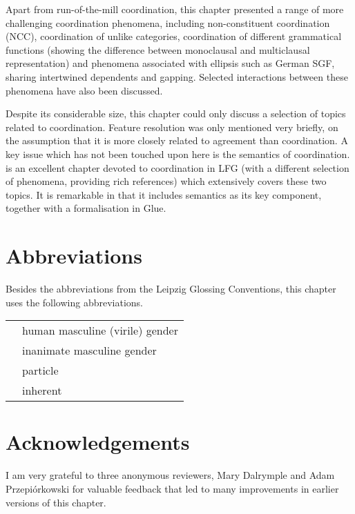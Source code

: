 \documentclass[output=paper]{../langscibook}
\begin{document}
Apart from run-of-the-mill coordination, this chapter
presented a range of more challenging coordination phenomena,
including non-constituent coordination (NCC), coordination of unlike
categories, coordination of different grammatical functions (showing
the difference between monoclausal and multiclausal representation)
and phenomena associated with ellipsis such as German SGF, sharing
intertwined dependents and gapping. Selected interactions between
these phenomena have also been discussed.

Despite its considerable size, this chapter could only discuss a
selection of topics related to coordination. Feature resolution was
only mentioned very briefly, on the assumption that it is more closely
related to agreement than coordination. A key issue which has not been
touched upon here is the semantics of
coordination. \citet[Chapter~16]{DLM:LFG} is an excellent chapter
devoted to coordination in LFG (with a different selection of
phenomena, providing rich references) which extensively covers these
two topics. It is remarkable in that it includes semantics as its key component,
together with a formalisation in Glue.

\section*{Abbreviations}

Besides the abbreviations from the Leipzig Glossing Conventions, this
chapter uses the following abbreviations.\medskip

\noindent\begin{tabularx}{\textwidth}{lQ}
 & human masculine (virile) gender\\
 & inanimate masculine gender\\
 & particle\\
 & inherent 
\end{tabularx}

\section*{Acknowledgements}

I am very grateful to three anonymous reviewers, Mary Dalrymple and
Adam Przepiórkowski for valuable feedback that led to many
improvements in earlier versions of this chapter.

\sloppy
\printbibliography[heading=subbibliography,notkeyword=this]
\end{document}
